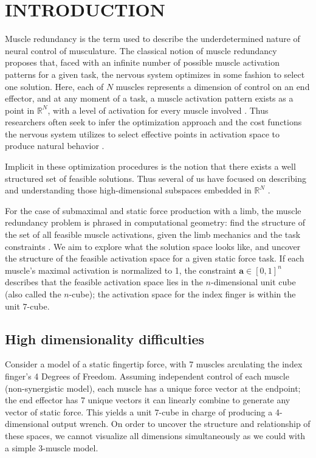 
\section{INTRODUCTION}

Muscle redundancy is the term used to describe the underdetermined nature of neural control of musculature.
The classical notion of muscle redundancy  proposes that, faced with an infinite number of possible muscle activation patterns for a given task, the nervous system optimizes in some fashion to select one solution.
Here, each of $N$ muscles represents a dimension of control on an end effector, and at any moment of a task, a muscle activation pattern exists as a point in $\mathbb{R}^N$, with a level of activation for every muscle involved \cite{Valero-Cuevas1998Large}.
Thus researchers often seek to infer the optimization approach and the cost functions the nervous system utilizes to select effective points in activation space to produce natural behavior \cite{Chao1978Graphical,Prilutsky2000Muscle,scott2004optimal,todorov2002optimal,crowninshield1981physiologically,higginson2005simulated}. 

Implicit in these optimization procedures is the notion that there exists a well structured set of feasible solutions. Thus several of us have focused on describing and understanding those high-dimensional subspaces  embedded in $\mathbb{R}^N$ \cite{kutch2011muscle,kutch2012challenges,sohn2013cat_bounding_box,Valero-Cuevas1998Large,Valero-Cuevas2015high-dimensional}.

For the case of submaximal and static force production with a limb, the muscle redundancy problem is phrased in computational geometry: find the structure of the set of all feasible muscle activations, given the limb mechanics and the task constraints \cite{avis1992Pivoting,Valero-Cuevas1998Large,Valero-Cuevas2009mathematical,Valero-Cuevas2015high-dimensional}. We aim to explore what the solution space looks like, and uncover the structure of the feasible activation space for a given static force task.
If each muscle's maximal activation is normalized to 1, the constraint $\textbf{a} \in [0,1]^n$ describes that the feasible activation space lies in the $n$-dimensional unit cube (also called the $n$-cube); the activation space for the index finger is within the unit $7$-cube.

\subsection{High dimensionality difficulties}
Consider a model of a static fingertip force, with 7 muscles arculating the index finger's 4 Degrees of Freedom.
Assuming independent control of each muscle (non-synergistic model), each muscle has a unique force vector at the endpoint; the end effector has 7 unique vectors it can linearly combine to generate any vector of static force.
This yields a unit $7$-cube in charge of producing a 4-dimensional output wrench.
On order to uncover the structure and relationship of these spaces, we cannot visualize all dimensions simultaneously as we could with a simple 3-muscle model.

